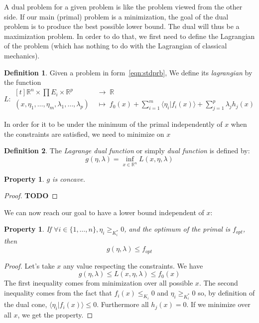 \documentclass[10pt]{report}
\theoremstyle{plain}
\newtheorem{prop}[thm]{Property}
\theoremstyle{definition}
\newtheorem{defn}{Definition}[chapter]
\theoremstyle{remark}
\newcommand{\R}{\ensuremath{\mathbb{R}}}
\newcommand{\TODO}{\textbf{TODO}}
\newcommand{\braket}[2]{\langle#1|#2\rangle}
\renewcommand{\geq}{\geqslant}
\renewcommand{\leq}{\leqslant}
\begin{document}
A dual problem for a given problem is like the problem viewed from the other
side. If our main (primal) problem is a minimization, the goal of the dual
problem is to produce the best possible lower bound. The dual will thus be a
maximization problem. In order to do that, we first
need to define the Lagrangian of the problem (which has nothing to do with the
Lagrangian of classical mechanics).

\begin{defn}
  Given a problem in form~\ref{eqn:stdprb}, We define its \emph{lagrangian} by
  the function
  \[ L:\begin{aligned}[t] \R^n \times \prod E_i \times \R^p \;&\to\; \R\\
      (x,\eta_1,\ldots,\eta_m,\lambda_1,\ldots,\lambda_p) \;&\mapsto\; f_0(x) +
      \sum_{i = 1}^m \braket {\eta_i}{f_i(x)} + \sum_{j = 1}^p \lambda_j h_j(x)
    \end{aligned}
  \]
\end{defn}


In order for it to be under the minimum of the primal independently of $x$ when the constraints are
satisfied, we need to minimize on $x$

\begin{defn}
  The \emph{Lagrange dual function} or simply \emph{dual function} is defined by:
  \[g(\eta,\lambda) = \inf_{x \in \R^n} L(x,\eta,\lambda)\]
\end{defn}

\begin{prop}
  $g$ is concave.
\end{prop}

\begin{proof}
  \TODO{}
\end{proof}

We can now reach our goal to have a lower bound independent of $x$:

\begin{prop}
  If $\forall i \in \{1,\ldots,n\}, \eta_i \geq_{K_i^*} 0$, and the optimum of the primal is
  $f_{opt}$, then
  \[g(\eta,\lambda) \leq f_{opt}\]
\end{prop}

\begin{proof}
  Let's take $x$ any value respecting the constraints. We have
  \[g(\eta,\lambda) \le L(x,\eta,\lambda) \le f_0(x)\]
  The first inequality comes from minimization over all possible $x$.
  The second inequality comes from the fact that $f_i(x) \leq_{K_i} 0$ and
  $\eta_i \geq_{K_i^*} 0$ so, by definition of the dual cone, $\braket
  {\eta_i}{f_i(x)} \leq 0$. Furthermore all $h_j(x) = 0$. If we minimize over
  all $x$, we get the property.
\end{proof}
\end{document}
